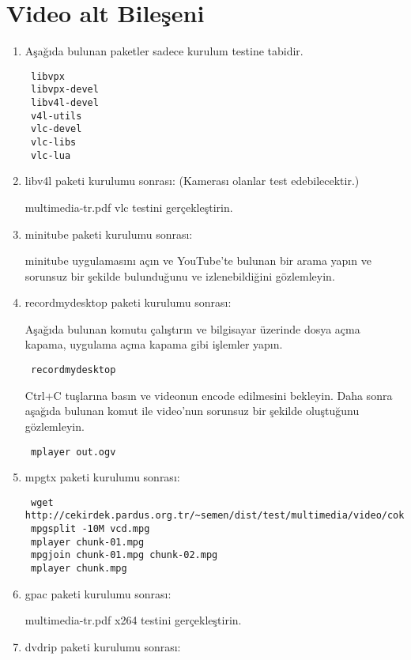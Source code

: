 \documentclass[a4paper,10pt]{article}
\begin{document}
\section{Video alt Bileşeni}
\begin{enumerate}
\item Aşağıda bulunan paketler sadece kurulum testine tabidir. 
\begin{verbatim}
 libvpx
 libvpx-devel
 libv4l-devel
 v4l-utils
 vlc-devel
 vlc-libs
 vlc-lua
\end{verbatim}
\item libv4l paketi kurulumu sonrası: (Kamerası olanlar test edebilecektir.)

multimedia-tr.pdf vlc testini gerçekleştirin.

\item minitube paketi kurulumu sonrası:

minitube uygulamasını açın ve YouTube'te bulunan bir arama yapın ve sorunsuz bir şekilde bulunduğunu ve izlenebildiğini gözlemleyin.
\item recordmydesktop paketi kurulumu sonrası:

Aşağıda bulunan komutu çalıştırın ve bilgisayar üzerinde dosya açma kapama, uygulama açma kapama gibi işlemler yapın. 
\begin{verbatim}
 recordmydesktop
\end{verbatim}

Ctrl+C tuşlarına basın ve videonun encode edilmesini bekleyin. Daha sonra aşağıda bulunan komut ile video'nun sorunsuz bir şekilde oluştuğunu gözlemleyin.

\begin{verbatim}
 mplayer out.ogv 
\end{verbatim}

\item mpgtx paketi kurulumu sonrası:

\begin{verbatim}
 wget http://cekirdek.pardus.org.tr/~semen/dist/test/multimedia/video/cokluortam/vcd.mpg
 mpgsplit -10M vcd.mpg
 mplayer chunk-01.mpg
 mpgjoin chunk-01.mpg chunk-02.mpg 
 mplayer chunk.mpg
\end{verbatim}

\item gpac paketi kurulumu sonrası:

multimedia-tr.pdf x264 testini gerçekleştirin.

\item dvdrip paketi kurulumu sonrası:


\end{enumerate}
\end{document}
